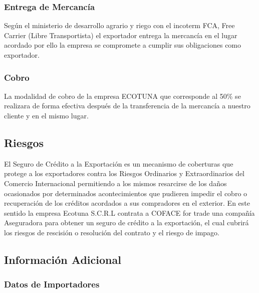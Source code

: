 \documentclass[
  stu,
  floatsintext,
  longtable,
  a4paper,
  nolmodern,
  notxfonts,
  notimes,
  12pt,
  colorlinks=true,linkcolor=blue,citecolor=blue,urlcolor=blue]{apa7}
\begin{document}
\subsubsection{Entrega de Mercancía}\label{entrega-de-mercancuxeda}

Según el ministerio de desarrollo agrario y riego con el incoterm FCA,
Free Carrier (Libre Transportista) el exportador entrega la mercancía en
el lugar acordado por ello la empresa se compromete a cumplir sus
obligaciones como exportador.

\subsubsection{Cobro}\label{cobro}

La modalidad de cobro de la empresa ECOTUNA que corresponde al 50\% se
realizara de forma efectiva después de la transferencia de la mercancía
a nuestro cliente y en el mismo lugar.

\subsection{Riesgos}\label{riesgos}

El Seguro de Crédito a la Exportación es un mecanismo de coberturas que
protege a los exportadores contra los Riesgos Ordinarios y
Extraordinarios del Comercio Internacional permitiendo a los mismos
resarcirse de los daños ocasionados por determinados acontecimientos que
pudieren impedir el cobro o recuperación de los créditos acordados a sus
compradores en el exterior. En este sentido la empresa Ecotuna S.C.R.L
contrata a COFACE for trade una compañía Aseguradora para obtener un
seguro de crédito a la exportación, el cual cubrirá los riesgos de
rescisión o resolución del contrato y el riesgo de impago.

\subsection{Información Adicional}\label{informaciuxf3n-adicional}

\subsubsection{Datos de Importadores}\label{datos-de-importadores}
\end{document}
